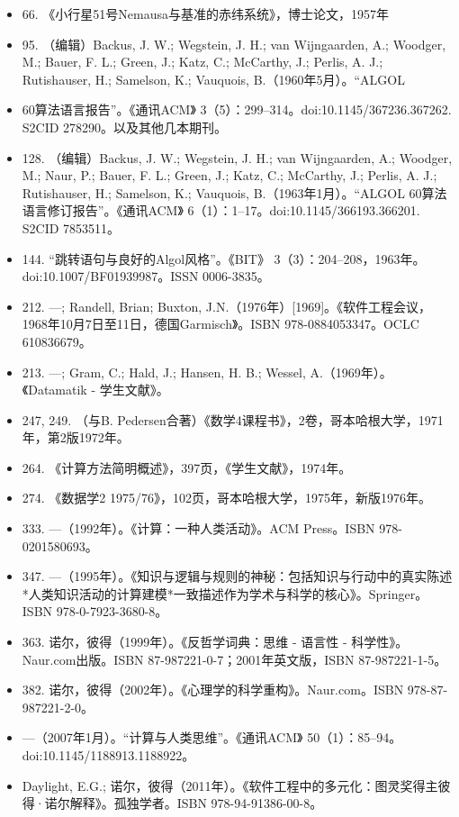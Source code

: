 \begin{itemize}
\item 66. 《小行星51号Nemausa与基准的赤纬系统》，博士论文，1957年  
\item 95. （编辑）Backus, J. W.; Wegstein, J. H.; van Wijngaarden, A.; Woodger, M.; Bauer, F. L.; Green, J.; Katz, C.; McCarthy, J.; Perlis, A. J.; Rutishauser, H.; Samelson, K.; Vauquois, B.（1960年5月）。“ALGOL \item 60算法语言报告”。《通讯ACM》 3（5）：299–314。doi:10.1145/367236.367262. S2CID 278290。以及其他几本期刊。  
\item 128. （编辑）Backus, J. W.; Wegstein, J. H.; van Wijngaarden, A.; Woodger, M.; Naur, P.; Bauer, F. L.; Green, J.; Katz, C.; McCarthy, J.; Perlis, A. J.; Rutishauser, H.; Samelson, K.; Vauquois, B.（1963年1月）。“ALGOL 60算法语言修订报告”。《通讯ACM》 6（1）：1–17。doi:10.1145/366193.366201. S2CID 7853511。  
\item 144. “跳转语句与良好的Algol风格”。《BIT》 3（3）：204–208，1963年。doi:10.1007/BF01939987。ISSN 0006-3835。  
\item 212. —; Randell, Brian; Buxton, J.N.（1976年）[1969]。《软件工程会议，1968年10月7日至11日，德国Garmisch》。ISBN 978-0884053347。OCLC 610836679。  
\item 213. —; Gram, C.; Hald, J.; Hansen, H. B.; Wessel, A.（1969年）。《Datamatik - 学生文献》。  
\item 247, 249. （与B. Pedersen合著）《数学4课程书》，2卷，哥本哈根大学，1971年，第2版1972年。  
\item 264. 《计算方法简明概述》，397页，《学生文献》，1974年。  
\item 274. 《数据学2 1975/76》，102页，哥本哈根大学，1975年，新版1976年。  
\item 333. —（1992年）。《计算：一种人类活动》。ACM Press。ISBN 978-0201580693。  
\item 347. —（1995年）。《知识与逻辑与规则的神秘：包括知识与行动中的真实陈述*人类知识活动的计算建模*一致描述作为学术与科学的核心》。Springer。ISBN 978-0-7923-3680-8。  
\item 363. 诺尔，彼得（1999年）。《反哲学词典：思维 - 语言性 - 科学性》。Naur.com出版。ISBN 87-987221-0-7；2001年英文版，ISBN 87-987221-1-5。  
\item 382. 诺尔，彼得（2002年）。《心理学的科学重构》。Naur.com。ISBN 978-87-987221-2-0。  
\item —（2007年1月）。“计算与人类思维”。《通讯ACM》 50（1）：85–94。doi:10.1145/1188913.1188922。  
\item Daylight, E.G.; 诺尔，彼得（2011年）。《软件工程中的多元化：图灵奖得主彼得·诺尔解释》。孤独学者。ISBN 978-94-91386-00-8。
\end{itemize}
